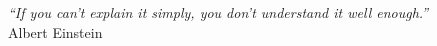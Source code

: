 
\cleardoublepage
\thispagestyle{plain}

\vspace*{8cm}

\begin{flushright}
   \textsl{``If you can't explain it simply, you don't understand it well enough.''} \\
\vspace*{1.5cm}
           Albert Einstein
\end{flushright}
